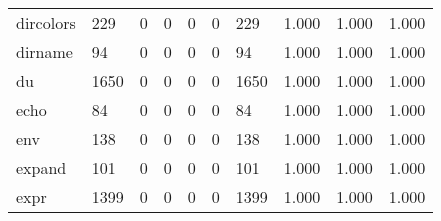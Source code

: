 \begin{longtable}{lp{2.0cm}p{2.0cm}p{2.0cm}p{2.0cm}p{2.0cm}p{2.0cm}p{2.0cm}p{2.0cm}p{2.0cm}}
dircolors &                    229 &                                  0 &                                 0 &                                0 &                                 0 &                             229 &                                1.000 &                                  1.000 &                                1.000 \\
dirname   &                     94 &                                  0 &                                 0 &                                0 &                                 0 &                              94 &                                1.000 &                                  1.000 &                                1.000 \\
du        &                   1650 &                                  0 &                                 0 &                                0 &                                 0 &                            1650 &                                1.000 &                                  1.000 &                                1.000 \\
echo      &                     84 &                                  0 &                                 0 &                                0 &                                 0 &                              84 &                                1.000 &                                  1.000 &                                1.000 \\
env       &                    138 &                                  0 &                                 0 &                                0 &                                 0 &                             138 &                                1.000 &                                  1.000 &                                1.000 \\
expand    &                    101 &                                  0 &                                 0 &                                0 &                                 0 &                             101 &                                1.000 &                                  1.000 &                                1.000 \\
expr      &                   1399 &                                  0 &                                 0 &                                0 &                                 0 &                            1399 &                                1.000 &                                  1.000 &                                1.000 \\

\end{longtable}
